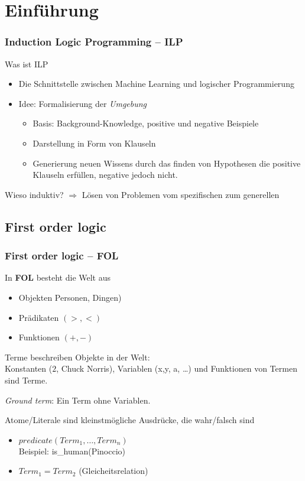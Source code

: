 \section{Einführung}

\begin{frame}
	\frametitle{Induction Logic Programming -- ILP}

	\begin{block}{Was ist ILP}
		\begin{itemize}
			\item Die Schnittstelle zwischen Machine Learning und logischer Programmierung
			\item {Idee: Formalisierung der \textit{Umgebung}
				\begin{itemize}
					\item Basis: Background-Knowledge, positive und negative Beispiele
					\item Darstellung in Form von Klauseln
					\item Generierung neuen Wissens durch das finden von Hypothesen die positive
					Klauseln erfüllen, negative jedoch nicht.
				\end{itemize}
			}
		\end{itemize}
	\end{block}
	Wieso induktiv?
	$\Rightarrow$ Lösen von Problemen vom spezifischen zum generellen
\end{frame}

\subsection{First order logic}
\begin{frame}
	\frametitle{First order logic -- FOL}
	\begin{block}{}
	In \textbf{FOL} besteht die Welt aus
	\begin{itemize}
		\item Objekten  Personen, Dingen)
		\item Prädikaten $(>, <)$
		\item Funktionen $(+, -)$
	\end{itemize}
	\end{block}


	Terme beschreiben Objekte in der Welt:\\
	Konstanten ($2$, Chuck Norris), Variablen (x,y, a, \ldots) und
	Funktionen von Termen sind Terme.

	\textit{Ground term}: Ein Term ohne Variablen.

	\begin{block}{}
		Atome/Literale sind kleinstmögliche Ausdrücke, die wahr/falsch sind
		\begin{itemize}
			\item $predicate(Term_1, \ldots, Term_n)$\\ 
				Beispiel: is\_human(Pinoccio)
			\item $Term_1 = Term_2$ (Gleicheitsrelation)
		\end{itemize}
	\end{block}

\end{frame}

